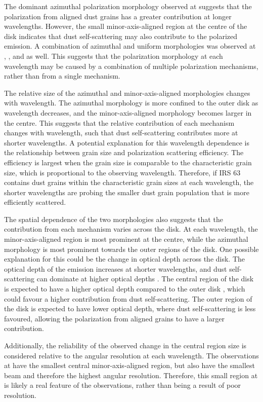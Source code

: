 The dominant azimuthal polarization morphology observed at \bfour suggests that the polarization from aligned dust grains has a greater contribution at longer wavelengths. However, the small minor-axis-aligned region at the centre of the disk indicates that dust self-scattering may also contribute to the polarized emission. A combination of azimuthal and uniform morphologies was observed at \bfiveNS, \bsixNS, and \bseven as well. This suggests that the polarization morphology at each wavelength may be caused by a combination of multiple polarization mechanisms, rather than from a single mechanism.


The relative size of the azimuthal and minor-axis-aligned morphologies changes with wavelength. The azimuthal morphology is more confined to the outer disk as wavelength decreases, and the minor-axis-aligned morphology becomes larger in the centre. This suggests that the relative contribution of each mechanism changes with wavelength, such that dust self-scattering contributes more at shorter wavelengths. A potential explanation for this wavelength dependence is the relationship between grain size and polarization scattering efficiency. The efficiency is largest when the grain size is comparable to the characteristic grain size, which is proportional to the observing wavelength. Therefore, if IRS 63 contains dust grains within the characteristic grain sizes at each wavelength, the shorter wavelengths are probing the smaller dust grain population that is more efficiently scattered. 


The spatial dependence of the two morphologies also suggests that the contribution from each mechanism varies across the disk. At each wavelength, the minor-axis-aligned region is most prominent at the centre, while the azimuthal morphology is most prominent towards the outer regions of the disk. One possible explanation for this could be the change in optical depth across the disk. The optical depth of the emission increases at shorter wavelengths, and dust self-scattering can dominate at higher optical depths \citep{Williams, Lin2022}. The central region of the disk is expected to have a higher optical depth compared to the outer disk \citep{Williams}, which could favour a higher contribution from dust self-scattering. The outer region of the disk is expected to have lower optical depth, where dust self-scattering is less favoured, allowing the polarization from aligned grains to have a larger contribution.


Additionally, the reliability of the observed change in the central region size is considered relative to the angular resolution at each wavelength. The observations at \bfour have the smallest central minor-axis-aligned region, but also have the smallest beam and therefore the highest angular resolution. Therefore, this small region at \bfour is likely a real feature of the observations, rather than being a result of poor resolution. 



